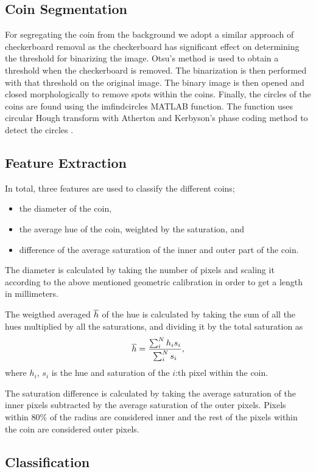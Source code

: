 \documentclass[report.tex]{subfile}
\begin{document}
\subsection{Coin Segmentation}
For segregating the coin from the background we adopt a similar approach of
checkerboard removal as the checkerboard has significant effect on determining
the threshold for binarizing the image. Otsu's method is used to obtain a
threshold when the checkerboard is removed. The binarization is then performed
with that threshold on the original image. The binary image is then opened and
closed morphologically to remove spots within the coins. Finally, the circles
of the coins are found using the imfindcircles MATLAB function. The function
uses circular Hough transform with Atherton and Kerbyson's phase coding method
to detect the circles \cite{matlab-imfindcircles}.

\subsection{Feature Extraction}
In total, three features are used to classify the different coins;
\begin{itemize}
    \item the diameter of the coin,
    \item the average hue of the coin, weighted by the saturation, and
    \item difference of the average saturation of the inner and outer part of
        the coin.
\end{itemize}
The diameter is calculated by taking the number of pixels and scaling it
according to the above mentioned geometric calibration in order to get a length
in millimeters.

The weigthed averaged $\overline{h}$ of the hue is calculated by taking the sum of
all the hues multiplied by all the saturations, and dividing it by the total
saturation as
\begin{equation*}
    \overline{h} = \frac{\sum_i^N h_i s_i}{\sum_i^N s_i},
\end{equation*}
where $h_i$, $s_i$ is the hue and saturation of the $i$:th pixel within the
coin.

The saturation difference is calculated by taking the average saturation of the
inner pixels subtracted by the average saturation of the outer pixels. Pixels
within 80\% of the radius are considered inner and the rest of the pixels
within the coin are considered outer pixels.

\subsection{Classification}
\end{document}
